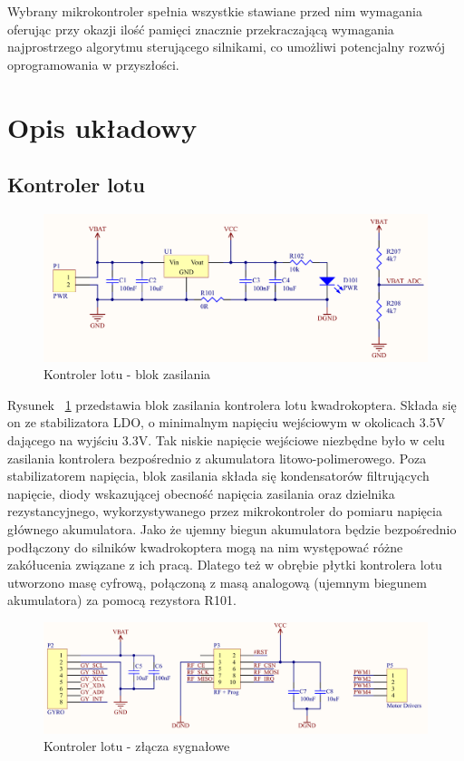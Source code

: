 Wybrany mikrokontroler spełnia wszystkie stawiane przed nim wymagania oferując przy okazji ilość pamięci znacznie przekraczającą wymagania najprostrzego algorytmu sterującego silnikami, co umożliwi potencjalny rozwój oprogramowania w przyszłości.

\section{Opis układowy}

\subsection{Kontroler lotu}

\begin{figure}[H]
	\centering
	\includegraphics[scale=0.4]{Pictures/QuadroController_PWR_C.png}
		\caption[Kontroler lotu - blok zasilania]{Kontroler lotu - blok zasilania}
	\label{fig:QuadroControllerPWR}
\end{figure}

Rysunek ~\ref{fig:QuadroControllerPWR} przedstawia blok zasilania kontrolera lotu kwadrokoptera. Składa się on ze stabilizatora LDO, o minimalnym napięciu wejściowym w okolicach 3.5V  dającego na wyjściu 3.3V. Tak niskie napięcie wejściowe niezbędne było w celu zasilania kontrolera bezpośrednio z akumulatora litowo-polimerowego. Poza stabilizatorem napięcia, blok zasilania składa się kondensatorów filtrujących napięcie, diody wskazującej obecność napięcia zasilania oraz dzielnika rezystancyjnego, wykorzystywanego przez mikrokontroler do pomiaru napięcia głównego akumulatora. Jako że ujemny biegun akumulatora będzie bezpośrednio podłączony do silników kwadrokoptera mogą na nim występować różne zakółucenia związane z ich pracą. Dlatego też w obrębie płytki kontrolera lotu utworzono masę cyfrową, połączoną z masą analogową (ujemnym biegunem akumulatora) za pomocą rezystora R101.

\begin{figure}[H]
	\centering
	\includegraphics[scale=0.36]{Pictures/QuadroController_Connector_C.png}
		\caption[Kontroler lotu - złącza sygnałowe]{Kontroler lotu - złącza sygnałowe}
	\label{fig:QuadrotorControllerConnectors}
\end{figure}

